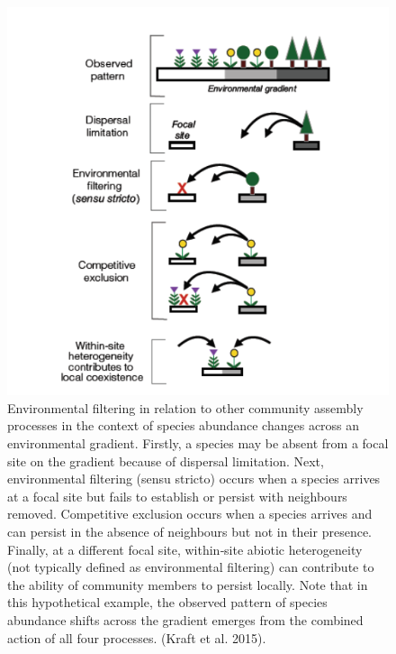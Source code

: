 \documentclass[
  12pt,
  oneside]{book}
\begin{document}
\begin{figure}

{\centering \includegraphics[width=0.8\linewidth]{figures/chap7/f78_kraft_filtering} 

}

\caption{Environmental filtering in relation to other community assembly processes in the context of species abundance changes across an environmental gradient. Firstly, a species may be absent from a focal site on the gradient because of dispersal limitation. Next, environmental filtering (sensu stricto) occurs when a species arrives at a focal site but fails to establish or persist with neighbours removed. Competitive exclusion occurs when a species arrives and can persist in the absence of neighbours but not in their presence. Finally, at a different focal site, within‐site abiotic heterogeneity (not typically defined as environmental filtering) can contribute to the ability of community members to persist locally. Note that in this hypothetical example, the observed pattern of species abundance shifts across the gradient emerges from the combined action of all four processes. (Kraft et al. 2015).}\label{fig:f78}
\end{figure}
\end{document}
